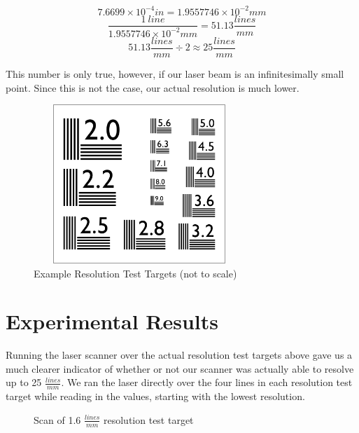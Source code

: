 \documentclass[letterpaper, 12pt]{article}
\begin{document}
$$ 7.6699\times10^{-4}in = 1.9557746\times10^{-2}mm $$
$$ \frac{1\ line}{1.9557746\times10^{-2}mm} = 51.13\frac{lines}{mm} $$
$$ 51.13\frac{lines}{mm} \div 2 \approx 25\frac{lines}{mm} $$

\par
This number is only true, however, if our laser beam is an infinitesimally small point. Since this is not the case, our actual resolution is much lower.

\begin{figure}[H]
  \centering
  \includegraphics[width=8cm,height=6cm]{resolution_test}
  \caption[caption]{Example Resolution Test Targets (not to scale)}
\end{figure}

\section{Experimental Results}
\par
Running the laser scanner over the actual resolution test targets above gave us a much clearer indicator of whether or not our scanner was actually able to resolve up to 25 $\frac{lines}{mm}$. We ran the laser directly over the four lines in each resolution test target while reading in the values, starting with the lowest resolution.

  \dataone
\begin{figure}[H]
  \centering
  \caption[caption]{Scan of 1.6 {$\frac{lines}{mm}$} resolution test target}
\end{figure}
\end{document}
